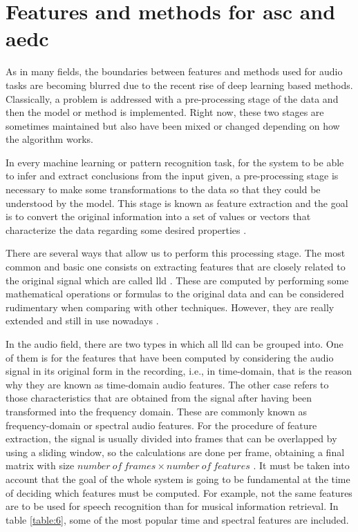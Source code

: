 
\section{Features and methods for \acrshort{asc} and \acrshort{aedc}}
\label{section:features-and-methods-for-asc-aedc}
	
	As in many fields, the boundaries between features and methods used for audio tasks are becoming blurred due to the recent rise of deep learning based methods. Classically, a problem is addressed with a pre-processing stage of the data and then the model or method is implemented. Right now, these two stages are sometimes maintained but also have been mixed or changed depending on how the algorithm works.


	In every machine learning or pattern recognition task, for the system to be able to infer and extract conclusions from the input given, a pre-processing stage is necessary to make some transformations to the data so that they could be understood by the model. This stage is known as feature extraction and the goal is to convert the original information into a set of values or vectors that characterize the data regarding some desired properties \cite{Giannakopoulos2014}.
	
	There are several ways that allow us to perform this processing stage. The most common and basic one consists on extracting features that are closely related to the original signal which are called \acrfull{lld}  \cite{Amatriain2004}. These are computed by performing some mathematical operations or formulas to the original data and can be considered rudimentary when comparing with other techniques. However, they are really extended and still in use nowadays \cite{Marr1982}. 

	In the audio field, there are two types in which all \acrshort{lld} can be grouped into. One of them is for the features that have been computed by considering the audio signal in its original form in the recording, i.e., in time-domain, that is the reason why they are known as time-domain audio features. The other case refers to those characteristics that are obtained from the signal after having been transformed into the frequency domain. These are commonly known as frequency-domain or spectral audio features. For the procedure of feature extraction, the signal is usually divided into frames that can be overlapped by using a sliding window, so the calculations are done per frame, obtaining a final matrix with size $number\ of\ frames \times number\ of\ features$ \cite{Giannakopoulos2014}. It must be taken into account that the goal of the whole system is going to be fundamental at the time of deciding which features must be computed. For example, not the same features are to be used for speech recognition than for musical information retrieval. In table \ref{table:6}, some of the most popular time and spectral features are included.
	
